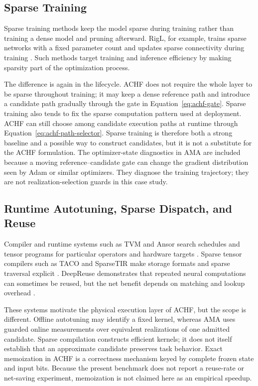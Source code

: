 \documentclass{article}
\newcommand{\achf}{\textsc{ACHF}}
\newcommand{\ama}{\textsc{AMA}}
\begin{document}
\subsection{Sparse Training}

Sparse training methods keep the model sparse during training rather than
training a dense model and pruning afterward. RigL, for example, trains sparse
networks with a fixed parameter count and updates sparse connectivity during
training \cite{evci2020rigging}. Such methods target training and inference
efficiency by making sparsity part of the optimization process.

The difference is again in the lifecycle. \achf{} does not require the whole
layer to be sparse throughout training; it may keep a dense reference path and
introduce a candidate path gradually through the gate in
Equation~\eqref{eq:achf-gate}. Sparse training also tends to fix the sparse
computation pattern used at deployment. \achf{} can still choose among
candidate execution paths at runtime through
Equation~\eqref{eq:achf-path-selector}. Sparse training is therefore both a
strong baseline and a possible way to construct candidates, but it is not a
substitute for the ACHF formulation. The optimizer-state diagnostics in
\ama{} are included because a moving reference--candidate gate can change the
gradient distribution seen by Adam or similar optimizers. They diagnose the
training trajectory; they are not realization-selection guards in this case study.

\subsection{Runtime Autotuning, Sparse Dispatch, and Reuse}

Compiler and runtime systems such as TVM and Ansor search schedules and tensor
programs for particular operators and hardware targets
\cite{chen2018tvm,zheng2020ansor}. Sparse tensor compilers such as TACO and
SparseTIR make storage formats and sparse traversal explicit
\cite{kjolstad2017taco,ye2023sparsetir}. DeepReuse demonstrates that repeated
neural computations can sometimes be reused, but the net benefit depends on
matching and lookup overhead \cite{ning2019deepreuse}.

These systems motivate the physical execution layer of \achf{}, but the scope
is different. Offline autotuning may identify a fixed kernel, whereas \ama{}
uses guarded online measurements over equivalent realizations of one admitted
candidate. Sparse compilation constructs efficient kernels; it does not itself
establish that an approximate candidate preserves task behavior. Exact
memoization in \achf{} is a correctness mechanism keyed by complete frozen
state and input bits. Because the present benchmark does not report a reuse-rate
or net-saving experiment, memoization is not claimed here as an empirical
speedup.
\end{document}
